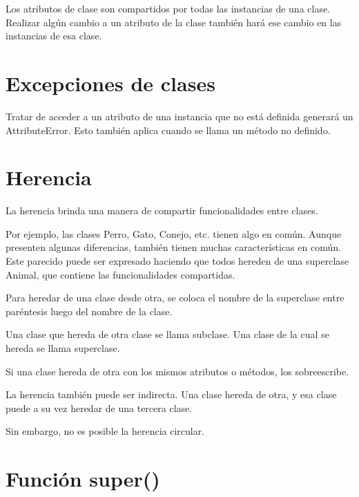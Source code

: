 \documentclass{report}
\begin{document}

Los atributos de clase son compartidos por todas las instancias de una clase. Realizar algún cambio a un atributo de la clase también hará ese cambio en las instancias de esa clase.


\section{Excepciones de clases}

Tratar de acceder a un atributo de una instancia que no está definida generará un AttributeError. Esto también aplica cuando se llama un método no definido.


\section{Herencia}

La herencia brinda una manera de compartir funcionalidades entre clases.

Por ejemplo, las clases Perro, Gato, Conejo, etc. tienen algo en común. Aunque presenten algunas diferencias, también tienen muchas características en común. Este parecido puede ser expresado haciendo que todos hereden de una superclase Animal, que contiene las funcionalidades compartidas.

Para heredar de una clase desde otra, se coloca el nombre de la superclase entre paréntesis luego del nombre de la clase.


Una clase que hereda de otra clase se llama subclase. Una clase de la cual se hereda se llama superclase.

Si una clase hereda de otra con los mismos atributos o métodos, los sobreescribe.


La herencia también puede ser indirecta. Una clase hereda de otra, y esa clase puede a su vez heredar de una tercera clase.


Sin embargo, no es posible la herencia circular.

\section{Función super()}
\end{document}
